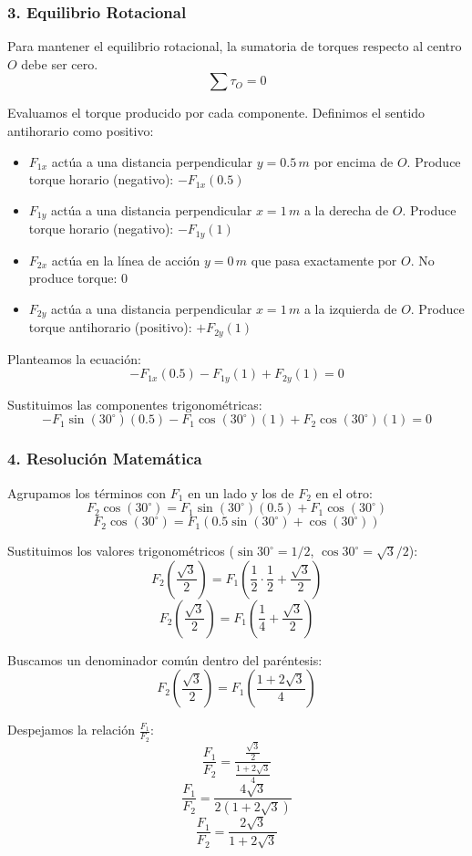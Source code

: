 \documentclass[12pt, a4paper]{article}
\begin{document}
\subsubsection*{3. Equilibrio Rotacional}
Para mantener el equilibrio rotacional, la sumatoria de torques respecto al centro $O$ debe ser cero.
$$\sum \tau_O = 0$$

Evaluamos el torque producido por cada componente. Definimos el sentido antihorario como positivo:
\begin{itemize}
    \item $F_{1x}$ actúa a una distancia perpendicular $y = 0.5 \, \si{m}$ por encima de $O$. Produce torque horario (negativo): $-F_{1x}(0.5)$
    \item $F_{1y}$ actúa a una distancia perpendicular $x = 1 \, \si{m}$ a la derecha de $O$. Produce torque horario (negativo): $-F_{1y}(1)$
    \item $F_{2x}$ actúa en la línea de acción $y = 0 \, \si{m}$ que pasa exactamente por $O$. No produce torque: $0$
    \item $F_{2y}$ actúa a una distancia perpendicular $x = 1 \, \si{m}$ a la izquierda de $O$. Produce torque antihorario (positivo): $+F_{2y}(1)$
\end{itemize}

Planteamos la ecuación:
$$-F_{1x}(0.5) - F_{1y}(1) + F_{2y}(1) = 0$$

Sustituimos las componentes trigonométricas:
$$-F_1 \sin(30^\circ)(0.5) - F_1 \cos(30^\circ)(1) + F_2 \cos(30^\circ)(1) = 0$$

\subsubsection*{4. Resolución Matemática}
Agrupamos los términos con $F_1$ en un lado y los de $F_2$ en el otro:
$$F_2 \cos(30^\circ) = F_1 \sin(30^\circ)(0.5) + F_1 \cos(30^\circ)$$
$$F_2 \cos(30^\circ) = F_1 \left( 0.5 \sin(30^\circ) + \cos(30^\circ) \right)$$

Sustituimos los valores trigonométricos ($\sin 30^\circ = 1/2$, $\cos 30^\circ = \sqrt{3}/2$):
$$F_2 \left( \frac{\sqrt{3}}{2} \right) = F_1 \left( \frac{1}{2} \cdot \frac{1}{2} + \frac{\sqrt{3}}{2} \right)$$
$$F_2 \left( \frac{\sqrt{3}}{2} \right) = F_1 \left( \frac{1}{4} + \frac{\sqrt{3}}{2} \right)$$

Buscamos un denominador común dentro del paréntesis:
$$F_2 \left( \frac{\sqrt{3}}{2} \right) = F_1 \left( \frac{1 + 2\sqrt{3}}{4} \right)$$

Despejamos la relación $\frac{F_1}{F_2}$:
$$\frac{F_1}{F_2} = \frac{\frac{\sqrt{3}}{2}}{\frac{1 + 2\sqrt{3}}{4}}$$
$$\frac{F_1}{F_2} = \frac{4\sqrt{3}}{2(1 + 2\sqrt{3})}$$
$$\frac{F_1}{F_2} = \frac{2\sqrt{3}}{1 + 2\sqrt{3}}$$
\end{document}
